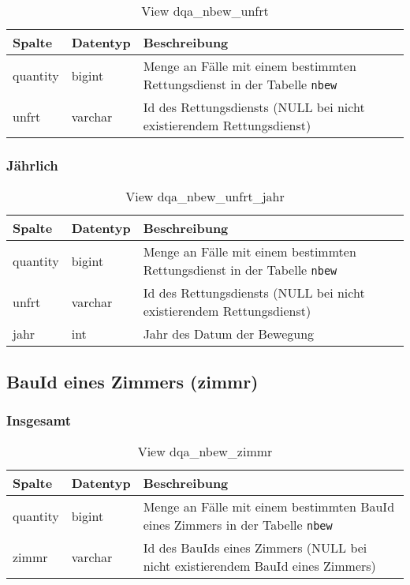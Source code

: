 \begin{table}[ht]
	\centering   
	\caption{View dqa\_nbew\_unfrt}
	\label{tab:bewUnfrtI}
	\begin{tabular}{||l|l|p{10cm}||}   		
		\hline
		Spalte & Datentyp & Beschreibung \\ [0.5ex]
		\hline\hline
		quantity & bigint & Menge an Fälle mit einem bestimmten Rettungsdienst in der Tabelle \texttt{nbew} \\
		\hline
		unfrt & varchar & Id des Rettungsdiensts (NULL bei nicht existierendem Rettungsdienst)\\
		\hline
	\end{tabular}
\end{table}

\subsubsection{Jährlich} \label{subsubsec:bewUnfrtJ}

\begin{table}[ht]
	\centering   
	\caption{View dqa\_nbew\_unfrt\_jahr}
	\label{tab:bewUnfrtJ}
	\begin{tabular}{||l|l|p{10cm}||}
		\hline
		Spalte & Datentyp & Beschreibung \\ [0.5ex]
		\hline\hline
		quantity & bigint & Menge an Fälle mit einem bestimmten Rettungsdienst in der Tabelle \texttt{nbew}\\
		\hline
		unfrt & varchar & Id des Rettungsdiensts (NULL bei nicht existierendem Rettungsdienst)\\
		\hline
		jahr & int &  Jahr des Datum der Bewegung \\
		\hline		
	\end{tabular}
\end{table}

\subsection{BauId eines Zimmers (zimmr)} \label{subsec:bewZimmr}

\subsubsection{Insgesamt} \label{subsubsec:bewZimmrI}

\begin{table}[ht]
	\centering   
	\caption{View dqa\_nbew\_zimmr}
	\label{tab:bewZimmrI}
	\begin{tabular}{||l|l|p{10cm}||}   		
		\hline
		Spalte & Datentyp & Beschreibung \\ [0.5ex]
		\hline\hline
		quantity & bigint & Menge an Fälle mit einem bestimmten BauId eines Zimmers in der Tabelle \texttt{nbew} \\
		\hline
		zimmr & varchar & Id des BauIds eines Zimmers (NULL bei nicht existierendem BauId eines Zimmers)\\
		\hline
	\end{tabular}
\end{table}

